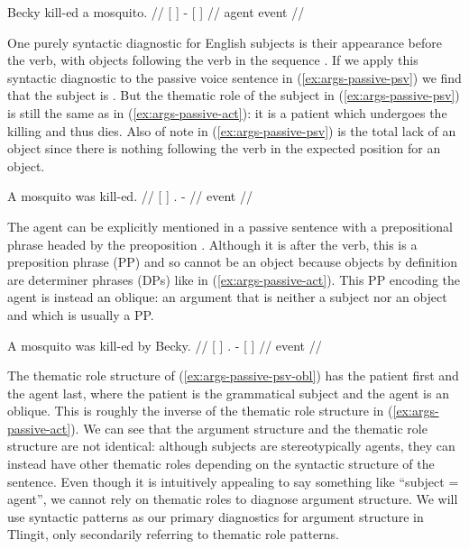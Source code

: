 \ex\label{ex:args-passive-act}%
%
\begingl
	\gla	{} Becky {} kill-ed {} a mosquito. {} //
	\glc	{}[  {}] - {}[   {}] //
	\gld	{} agent {} event {}  {} {} //
\endgl
\xe

One purely syntactic diagnostic for English subjects is their appearance before the verb, with objects following the verb in the sequence . If we apply this syntactic diagnostic to the passive voice sentence in (\ref{ex:args-passive-psv}) we find that the subject is . But the thematic role of the subject  in (\ref{ex:args-passive-psv}) is still the same as in (\ref{ex:args-passive-act}): it is a patient which undergoes the killing and thus dies. Also of note in (\ref{ex:args-passive-psv}) is the total lack of an object since there is nothing following the verb in the expected position for an object.

\ex\label{ex:args-passive-psv}%
%
\begingl
	\gla	{} A mosquito {} was kill-ed. //
	\glc	{}[   {}] . - //
	\gld	{}  {} {} {} event //
\endgl
\xe

The agent can be explicitly mentioned in a passive sentence with a prepositional phrase headed by the preoposition . Although it is after the verb, this is a preposition phrase (PP) and so cannot be an object because objects by definition are determiner phrases (DPs) like  in (\ref{ex:args-passive-act}). This PP  encoding the agent is instead an oblique: an argument that is neither a subject nor an object and which is usually a PP.

\ex\label{ex:args-passive-psv-obl}%
%
\begingl
	\gla	{} A mosquito {} was kill-ed {} by Becky. {} //
	\glc	{}[   {}] . - {}[   {}] //
	\gld	{}  {} {} {} event {}  {} {} //
\endgl
\xe

The thematic role structure of (\ref{ex:args-passive-psv-obl}) has the patient first and the agent last, where the patient is the grammatical subject and the agent is an oblique. This is roughly the inverse of the thematic role structure in (\ref{ex:args-passive-act}). We can see that the argument structure and the thematic role structure are not identical: although subjects are stereotypically agents, they can instead have other thematic roles depending on the syntactic structure of the sentence. Even though it is intuitively appealing to say something like “subject = agent”, we cannot rely on thematic roles to diagnose argument structure. We will use syntactic patterns as our primary diagnostics for argument structure in Tlingit, only secondarily referring to thematic role patterns.

